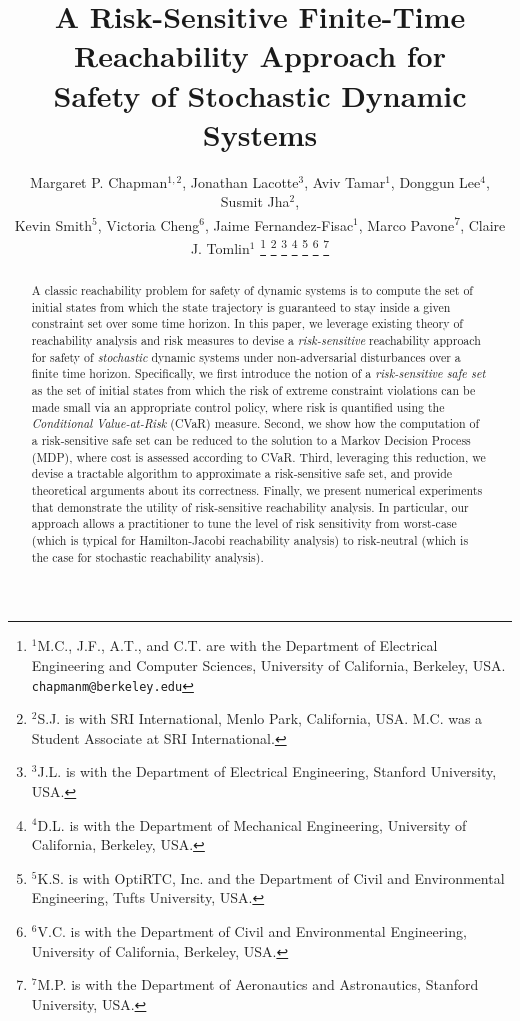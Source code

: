 \documentclass[letterpaper, 10 pt, conference]{ieeeconf}  %
\title{\LARGE \bf
A Risk-Sensitive Finite-Time Reachability Approach for \\Safety of Stochastic Dynamic Systems}
\author{Margaret P. Chapman$^{1,2}$, Jonathan Lacotte$^{3}$, Aviv Tamar$^{1}$, Donggun Lee$^{4}$, Susmit Jha$^{2}$, \\
Kevin Smith$^{5}$, Victoria Cheng$^{6}$, Jaime Fernandez-Fisac$^{1}$, Marco Pavone\textsuperscript{7}, Claire J. Tomlin$^{1}$%
\thanks{$^{1}$M.C., J.F., A.T., and C.T. are with the Department of Electrical Engineering and Computer Sciences, University of California, Berkeley, USA.
        {\tt\small chapmanm@berkeley.edu}}%
\thanks{$^{2}$S.J. is with SRI International, Menlo Park, California, USA. M.C. was a Student Associate at SRI International.
        }%
\thanks{$^{3}$J.L. is with the Department of Electrical Engineering, Stanford University, USA.
        }%
\thanks{$^{4}$D.L. is with the Department of Mechanical Engineering, University of California, Berkeley, USA.
        }%
\thanks{$^{5}$K.S. is with OptiRTC, Inc. and the Department of Civil and Environmental Engineering, Tufts University, USA.
        }%
\thanks{$^{6}$V.C. is with the Department of Civil and Environmental Engineering, University of California, Berkeley, USA.
        }%
        \thanks{$^{7}$M.P. is with the Department of Aeronautics and Astronautics, Stanford University, USA.
        }%
}
\begin{document}
\maketitle
\thispagestyle{empty}
\pagestyle{empty}

\begin{abstract}
A classic reachability problem for safety of dynamic systems is to compute the set of initial states from which 
the state trajectory is guaranteed to stay inside a given constraint set over some time horizon. 
In this paper, we leverage existing theory of reachability analysis and risk measures to devise a \textit{risk-sensitive} reachability approach for safety of {\em stochastic} dynamic systems under non-adversarial disturbances
over a finite time horizon. Specifically, we first introduce the notion of a \textit{risk-sensitive safe set} as the set of initial states from which 
the risk of extreme constraint violations can be made small via an appropriate control policy, where risk is quantified 
using the \textit{Conditional Value-at-Risk} (CVaR) measure. Second, we show how the computation of a risk-sensitive safe set can be reduced to the 
solution to a Markov Decision Process (MDP), where cost is assessed according to CVaR. 
Third, leveraging this reduction, we devise a tractable algorithm to approximate a risk-sensitive safe set, 
and provide theoretical arguments about its correctness. 
Finally, we present numerical experiments that demonstrate the utility of risk-sensitive reachability analysis. 
In particular, our approach allows a practitioner to tune the level of risk sensitivity from worst-case 
(which is typical for Hamilton-Jacobi reachability analysis) to risk-neutral 
(which is the case for stochastic reachability analysis). %
\end{abstract}
\end{document}
